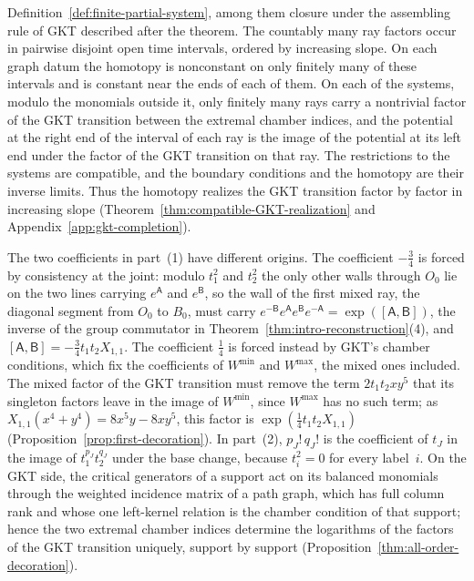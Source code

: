 \begin{maintheorem}
\begin{enumerate}
Definition~\ref{def:finite-partial-system}, among them closure under the
assembling rule of GKT described after the theorem.  The countably many ray
factors occur in
pairwise disjoint open time intervals, ordered by increasing slope.  On each
graph datum the homotopy is nonconstant on only finitely many of these
intervals and is constant near the ends of each of them.  On each of the
systems, modulo the monomials outside it, only finitely many rays carry a
nontrivial factor of the GKT transition between the extremal chamber
indices, and the potential at the right end of the interval of each ray is
the image of the potential at its left end under the factor of the GKT
transition on that ray.  The restrictions to the systems are compatible, and
the boundary conditions and the homotopy are their inverse limits.  Thus the
homotopy realizes the GKT transition factor by factor in increasing slope
(Theorem~\ref{thm:compatible-GKT-realization} and
Appendix~\ref{app:gkt-completion}).
\end{enumerate}
\end{maintheorem}

The two coefficients in part~(1) have different origins.  The coefficient
$-\frac34$ is forced by consistency at the joint: modulo $t_1^2$ and $t_2^2$
the only other walls through $O_0$ lie on the two lines carrying
$e^{\mathsf A}$ and $e^{\mathsf B}$, so the wall of the first mixed ray, the
diagonal segment from $O_0$ to $B_0$, must carry
$e^{-\mathsf B}e^{\mathsf A}e^{\mathsf B}e^{-\mathsf A}=\exp([\mathsf A,\mathsf B])$,
the inverse of the group commutator in
Theorem~\ref{thm:intro-reconstruction}(4), and
$[\mathsf A,\mathsf B]=-\frac34t_1t_2X_{1,1}$.
The coefficient $\frac14$ is forced instead by GKT's chamber conditions,
which fix the coefficients of $W^{\min}$ and $W^{\max}$, the mixed ones
included.  The mixed factor of the GKT transition must remove the term
$2t_1t_2xy^5$ that its singleton factors leave in the image of $W^{\min}$,
since $W^{\max}$ has no such term; as $X_{1,1}(x^4+y^4)=8x^5y-8xy^5$, this
factor is $\exp(\frac14t_1t_2X_{1,1})$
(Proposition~\ref{prop:first-decoration}).
In part~(2), $p_J!\,q_J!$ is the coefficient of $t_J$ in the image of
$t_1^{p_J}t_2^{q_J}$ under the base change, because $t_i^2=0$ for every
label~$i$.  On the GKT side, the critical generators of a support act on
its balanced monomials through the weighted incidence matrix of a path
graph, which has full column rank and whose one left-kernel relation is the
chamber condition of that support; hence the two extremal chamber indices
determine the logarithms of the factors of the GKT transition uniquely,
support by support
(Proposition~\ref{thm:all-order-decoration}).

